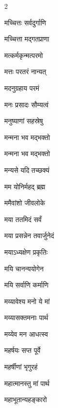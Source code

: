 \begin{multicols}{2}
\begin{indexlist}
\item मच्चित्तः सर्वदुर्गाणि \dotfill {}
\item मच्चित्ता मद्गतप्राणा \dotfill {}
\item मत्कर्मकृन्मत्परमो \dotfill {}
\item मत्तः परतरं नान्यत् \dotfill {}
\item मदनुग्रहाय परमं \dotfill {}
\item मनः प्रसादः सौम्यत्वं \dotfill {}
\item मनुष्याणां सहस्रेषु \dotfill {}
\item मन्मना भव मद्भक्तो \dotfill {}
\item मन्मना भव मद्भक्तो \dotfill {}
\item मन्यसे यदि तच्छक्यं \dotfill {}
\item मम योनिर्महद् ब्रह्म \dotfill {}
\item ममैवांशो जीवलोके \dotfill {}
\item मया ततमिदं सर्वं \dotfill {}
\item मया प्रसन्नेन तवार्जुनेदं \dotfill {}
\item मयाऽध्यक्षेण प्रकृतिः \dotfill {}
\item मयि चानन्ययोगेन \dotfill {}
\item मयि सर्वाणि कर्माणि \dotfill {}
\item मय्यावेश्य मनो ये मां \dotfill {}
\item मय्यासक्तमनाः पार्थ \dotfill {}
\item मय्येव मन आधत्स्व \dotfill {}
\item महर्षयः सप्त पूर्वे \dotfill {}
\item महर्षीणां भृगुरहं \dotfill {}
\item महात्मानस्तु मां पार्थ \dotfill {}
\item महाभूतान्यहङ्कारो \dotfill {}

\end{indexlist}
\end{multicols}

